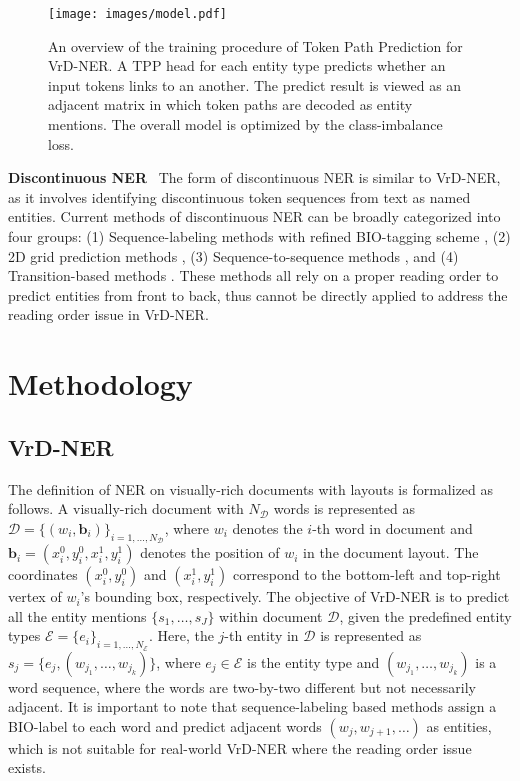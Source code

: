 \documentclass[11pt]{article}
\begin{document}
\begin{figure*}[t]
    \centering
\texttt{[image: images/model.pdf]}        
    \caption{
        An overview of the training procedure of Token Path Prediction for VrD-NER. A TPP head for each entity type predicts whether an input tokens links to an another. The predict result is viewed as an adjacent matrix in which token paths are decoded as entity mentions. The overall model is optimized by the class-imbalance loss. }
\label{fig:model}
\end{figure*}

\noindent \textbf{Discontinuous NER} \ 
The form of discontinuous NER is similar to VrD-NER, as it involves identifying discontinuous token sequences from text as named entities.
Current methods of discontinuous NER can be broadly categorized into four groups: (1) Sequence-labeling methods with refined BIO-tagging scheme \citep{tang2015recognizing,dirkson2021fuzzybio}, (2) 2D grid prediction methods \citep{wang2021discontinuous,li2022unified,liu2022toe}, (3) Sequence-to-sequence methods \citep{li2021span,he2022setgner}, and (4) Transition-based methods \citep{dai2020effective}. These methods all rely on a proper reading order to predict entities from front to back, thus cannot be directly applied to address the reading order issue in VrD-NER. 

\section{Methodology}

\subsection{VrD-NER}

The definition of NER on visually-rich documents with layouts is formalized as follows. 
A visually-rich document with $N_{\mathcal{D}}$ words is represented as $\mathcal{D}=\{(w_i, \textbf{b}_i)\}_{i=1,\dots,N_{\mathcal{D}}}$, where $w_i$ denotes the $i$-th word in document and $\textbf{b}_i=(x_i^0, y_i^0, x_i^1, y_i^1)$ denotes the position of $w_i$ in the document layout. The coordinates $(x_i^0, y_i^0)$ and $(x_i^1, y_i^1)$ correspond to the bottom-left and top-right vertex of $w_i$'s bounding box, respectively. 
The objective of VrD-NER is to predict all the entity mentions $\{s_1,\dots,s_J\}$ within document $\mathcal{D}$, given the predefined entity types $\mathcal{E}=\{e_i\}_{i=1,\dots,N_{\mathcal{E}}}$. 
Here, the $j$-th entity in $\mathcal{D}$ is represented as $s_j=\{e_j,(w_{j_1},\dots,w_{j_k})\}$, where $e_j \in \mathcal{E}$ is the entity type and $(w_{j_1},\dots,w_{j_k})$ is a word sequence, where the words are two-by-two different but not necessarily adjacent. It is important to note that sequence-labeling based methods assign a BIO-label to each word and predict adjacent words $(w_{j},w_{j+1},\dots)$ as entities, which is not suitable for real-world VrD-NER where the reading order issue exists. 
\end{document}
